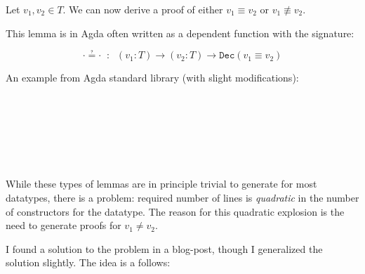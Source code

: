 \begin{lemma}
  Let $v_1, v_2 \in T$. We can now derive a proof of either $v_1 \equiv v_2$ or
  $v_1 \not\equiv v_2$.
\end{lemma}

This lemma is in Agda often written as a dependent function with the signature:

$$\cdot ≟ \cdot\;\;:\;\;(v_1 : T) \to (v_2 : T) \to \mathtt{Dec}(v_1 \equiv v_2)$$

An example from Agda standard library (with slight modifications):

\begin{code}%
\>\<%
\\
\> \AgdaSymbol{:} \AgdaSymbol{(} \AgdaSymbol{:} \AgdaSymbol{)}  \AgdaSymbol{(} \AgdaSymbol{:} \AgdaSymbol{)}   \AgdaSymbol{(}  \AgdaSymbol{)}\<%
\\
\> \<[6]%
\>[6]  \<[14]%
\>[14]\AgdaSymbol{=}  \<%
\\
\>   \AgdaSymbol{=}  \<%
\\
\> \<[6]%
\>[6]  \AgdaSymbol{=}  \<%
\\
\>   \<[14]%
\>[14]\AgdaSymbol{=}  \<%
\end{code}

\paragraph{}
While these types of lemmas are in principle trivial to generate for most
datatypes, there is a problem: required number of lines is \emph{quadratic} in
the number of constructors for the datatype. The reason for this quadratic
explosion is the need to generate proofs for $v_1 \neq v_2$.

I found a solution to the problem in a blog-post\cite{deceq}, though I
generalized the solution slightly. The idea is a follows:

